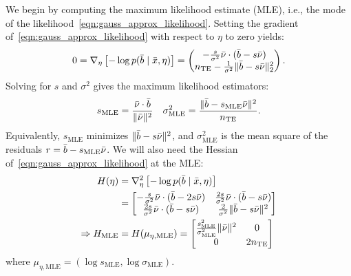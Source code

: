 We begin by computing the maximum likelihood estimate (\gls*{MLE}), i.e., the mode of the likelihood~\eqref{eqn:gauss_approx_likelihood}.
Setting the gradient of~\eqref{eqn:gauss_approx_likelihood} with respect to $\eta$ to zero yields:
\begin{align*}
    0 = \nabla_{\eta} \left[ -\log p(\bar{b} \mid \bar{x}, \eta) \right] =
    \begin{pmatrix}
        -\frac{s}{\sigma^2} \bar{\nu} \cdot (\bar{b} - s \bar{\nu}) \\
        n_{\mathrm{TE}} - \frac{1}{\sigma^2} \lVert \bar{b} - s\bar{\nu} \rVert_2^2
    \end{pmatrix}.
\end{align*}
Solving for $s$ and $\sigma^2$ gives the maximum likelihood estimators:
\begin{align}\label{eqn:gauss_approx_mle}
    s_{\text{MLE}} = \frac{\bar{\nu} \cdot \bar{b}}{\lVert \bar{\nu} \rVert^2}
    \quad
    \sigma_{\text{MLE}}^2 = \frac{\lVert \bar{b} - s_{\text{MLE}}\bar{\nu} \rVert^2}{n_{\mathrm{TE}}}.
\end{align}
Equivalently, $s_{\text{MLE}}$ minimizes $\lVert \bar{b} - s\bar{\nu} \rVert^2$, and $\sigma_{\text{MLE}}^2$ is the mean square of the residuals $r = \bar{b} - s_{\text{MLE}}\bar{\nu}$.
We will also need the Hessian of~\eqref{eqn:gauss_approx_likelihood} at the \gls*{MLE}:
\begin{align*}
    H(\eta)                    & = \nabla_{\eta}^2 \left[ -\log p(\bar{b} \mid \bar{x}, \eta) \right] \\
                               & =
    \begin{bmatrix}
        -\frac{s}{\sigma^2} \bar{\nu} \cdot (\bar{b} - 2s \bar{\nu}) & \frac{2s}{\sigma^2} \bar{\nu} \cdot (\bar{b} - s \bar{\nu}) \\
        \frac{2s}{\sigma^2} \bar{\nu} \cdot (\bar{b} - s \bar{\nu})  & \frac{2}{\sigma^2} \lVert \bar{b} - s\bar{\nu} \rVert^2
    \end{bmatrix}                                                                                    \\
    \Rightarrow H_{\text{MLE}} & = H(\mu_{\eta,\text{MLE}}) =
    \begin{bmatrix}
        \frac{s_{\text{MLE}}^2}{\sigma_{\text{MLE}}^2}  \lVert \bar{\nu} \rVert^2 & 0         \\
        0                                                                         & 2 n_{\mathrm{TE}}
    \end{bmatrix}
\end{align*}
where $\mu_{\eta,\text{MLE}} = (\log s_{\text{MLE}}, \log \sigma_{\text{MLE}})$.

